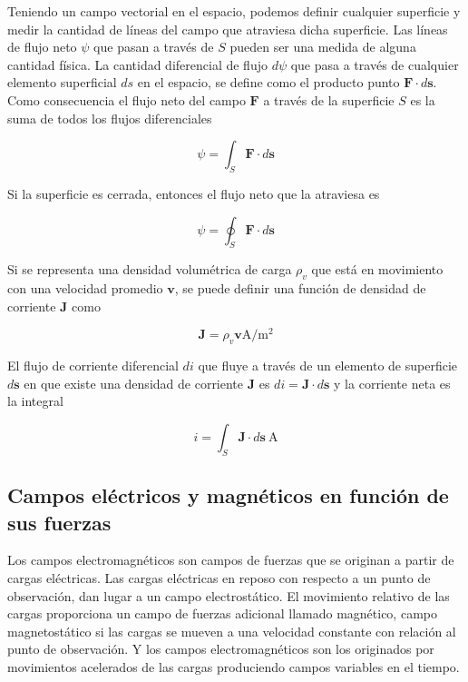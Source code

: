 Teniendo un campo vectorial en el espacio, podemos definir cualquier superficie y medir la cantidad de líneas del campo que atraviesa dicha superficie. Las líneas de flujo neto $\psi$ que pasan a través de $S$ pueden ser una medida de alguna cantidad física. La cantidad diferencial de flujo $d \psi$ que pasa a través de cualquier elemento superficial $ds$ en el espacio, se define como el producto punto $\mathbf{F} \cdot d \mathbf{s}$. Como consecuencia el flujo neto del campo $\mathbf{F}$ a través de la superficie $S$ es la suma de todos los flujos diferenciales

\begin{equation*}
\psi = \int_S \mathbf{F} \cdot d \mathbf{s}
\end{equation*}

Si la superficie es cerrada, entonces el flujo neto que la atraviesa es

\begin{equation*}
\psi = \oint_S \mathbf{F} \cdot d \mathbf{s}
\end{equation*}


Si se representa una densidad volumétrica de carga $\rho_v$ que está en movimiento con una velocidad promedio $\mathbf{v}$, se puede definir una función de densidad de corriente $\mathbf{J}$ como

\begin{equation*}
\mathbf{J} = \rho_v \mathbf{v} \text{A}/\text{m}^2
\end{equation*}

El flujo de corriente diferencial $di$ que fluye a través de un elemento de superficie $d \mathbf{s}$ en que existe una densidad de corriente $\mathbf{J}$ es $di = \mathbf{J} \cdot d\mathbf{s}$ y la corriente neta es la integral

\begin{equation*}
i = \int_S \mathbf{J} \cdot d \mathbf{s} \ \text{A} 
\end{equation*}

\subsection{Campos eléctricos y magnéticos en función de sus fuerzas}

Los campos electromagnéticos son campos de fuerzas que se originan a partir de cargas eléctricas. Las cargas eléctricas en reposo con respecto a un punto de observación, dan lugar a un campo electrostático. El movimiento relativo de las cargas proporciona un campo de fuerzas adicional llamado magnético, campo magnetostático si las cargas se mueven a una velocidad constante con relación al punto de observación. Y los campos electromagnéticos son los originados por movimientos acelerados de las cargas produciendo campos variables en el tiempo. \\

